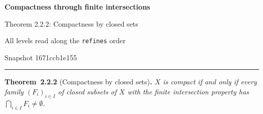 \documentclass[11pt]{article}
\newenvironment{bpstatement}[2]{\par\addvspace{0.6\baselineskip}\noindent\textbf{#1}#2\textbf{.}\enspace\ignorespaces}
  {\par\addvspace{0.4\baselineskip}}
\newenvironment{bpstatementit}[2]{\begin{bpstatement}{#1}{#2}\itshape\ignorespaces}{\end{bpstatement}}
\begin{document}
\pagestyle{plain}
\begin{center}
{\LARGE\bfseries Compactness through finite intersections\par}
\vspace{0.7em}
{\large Theorem 2.2.2: Compactness by closed sets\par}
\vspace{0.5em}
{\small\color{bpmuted}All levels \textperiodcentered{} read along the \texttt{refines} order\par}
{\small\color{bpmuted}Snapshot 1671ccb1e155\par}
\end{center}
\vspace{0.5em}
{\small\tableofcontents}
\bigskip\hrule\bigskip

\label{bp1}%
\begin{bpstatementit}{Theorem~2.2.2}{ (Compactness by closed sets)}
\(X\) is compact if and only if every family \((F_i)_{i \in I}\) of closed subsets of \(X\) with the finite intersection property has \(\bigcap_{i \in I} F_i \neq \emptyset\).
\end{bpstatementit}
\label{bp2}%
\end{document}
